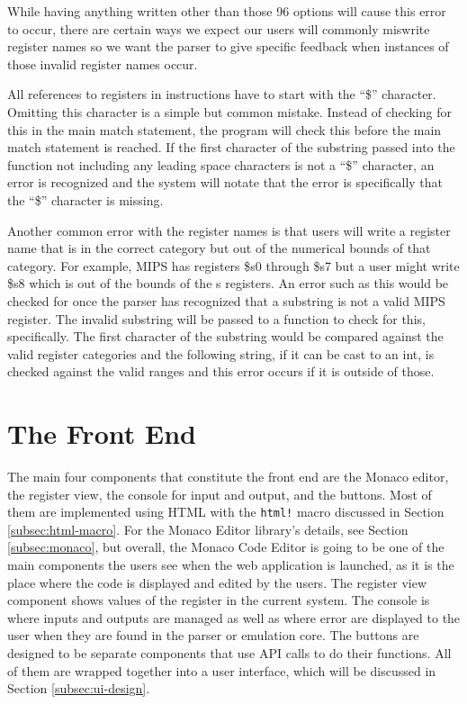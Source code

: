 \documentclass[
    paper=letter,
    parskip=half,
    fontsize=12pt,
    titlepage=firstiscover,
    toc=bibliography,
    numbers=endperiod
]{scrartcl}
\let\oldsection\section
\renewcommand{\section}{\newpage\oldsection}
\begin{document}
While having anything written other than those 96 options will cause
this error to occur, there are certain ways we expect our users will
commonly miswrite register names so we want the parser to give specific
feedback when instances of those invalid register names occur.

All references to registers in instructions have to start with the
``\$'' character. Omitting this character is a simple but common
mistake. Instead of checking for this in the main match statement, the
program will check this before the main match statement is reached. If
the first character of the substring passed into the function not
including any leading space characters is not a ``\$'' character, an
error is recognized and the system will notate that the error is
specifically that the ``\$'' character is missing.

Another common error with the register names is that users will write a
register name that is in the correct category but out of the numerical
bounds of that category. For example, MIPS has registers \$s0 through
\$s7 but a user might write \$s8 which is out of the bounds of the s
registers. An error such as this would be checked for once the parser
has recognized that a substring is not a valid MIPS register. The
invalid substring will be passed to a function to check for this,
specifically. The first character of the substring would be compared
against the valid register categories and the following string, if it
can be cast to an int, is checked against the valid ranges and this
error occurs if it is outside of those.

\section{The Front End}
\label{sec:front-end}

The main four components that constitute the front end are the Monaco
editor, the register view, the console for input and output, and the
buttons. Most of them are implemented using HTML with the \texttt{html!}
macro discussed in Section \ref{subsec:html-macro}. For the Monaco
Editor library's details, see Section \ref{subsec:monaco}, but overall,
the Monaco Code Editor is going to be one of the main components the
users see when the web application is launched, as it is the place where
the code is displayed and edited by the users. The register view
component shows values of the register in the current system. The
console is where inputs and outputs are managed as well as where error
are displayed to the user when they are found in the parser or emulation
core. The buttons are designed to be separate components that use API
calls to do their functions. All of them are wrapped together into a
user interface, which will be discussed in Section
\ref{subsec:ui-design}.
\end{document}
